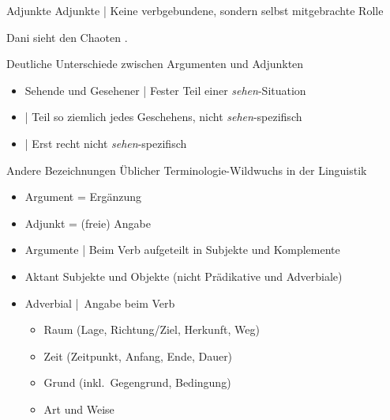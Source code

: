 \begin{frame}
  {Adjunkte}
  \onslide<+->
  \onslide<+->
  \alert{Adjunkte} | Keine verbgebundene, sondern \alert{selbst mitgebrachte} Rolle\\
  \onslide<+->
  \Halbzeile
  \begin{exe}
    \ex \alert{Dani} sieht \alert{den Chaoten}  .
  \end{exe}
  \onslide<+->
  \Zeile
  Deutliche Unterschiede zwischen Argumenten und Adjunkten\\
  \Halbzeile
  \begin{itemize}[<+->]
    \item \alert{Sehende und Gesehener} | Fester Teil einer \textit{sehen}-Situation
    \item {} | Teil so ziemlich jedes Geschehens, nicht \textit{sehen}-spezifisch
    \item {} | Erst recht nicht \textit{sehen}-spezifisch
  \end{itemize}
\end{frame}
 
\begin{frame}
  {Andere Bezeichnungen}
  \onslide<+->
  \onslide<+->
  Üblicher Terminologie-Wildwuchs in der Linguistik\\
  \Zeile
  \begin{itemize}[<+->]
    \item Argument = \alert{Ergänzung}
    \item Adjunkt = \alert{(freie) Angabe}
      \Halbzeile
    \item Argumente | Beim Verb aufgeteilt in \alert{Subjekte} und \alert{Komplemente} 
    \item \alert{Aktant} Subjekte und Objekte (nicht Prädikative und Adverbiale)
      \Halbzeile
    \item \alert{Adverbial} | Angabe beim Verb
      \begin{itemize}
        \item Raum (Lage, Richtung/Ziel, Herkunft, Weg)
        \item Zeit (Zeitpunkt, Anfang, Ende, Dauer)
        \item Grund (inkl.\ Gegengrund, Bedingung)
        \item Art und Weise
      \end{itemize}
  \end{itemize}
\end{frame}


